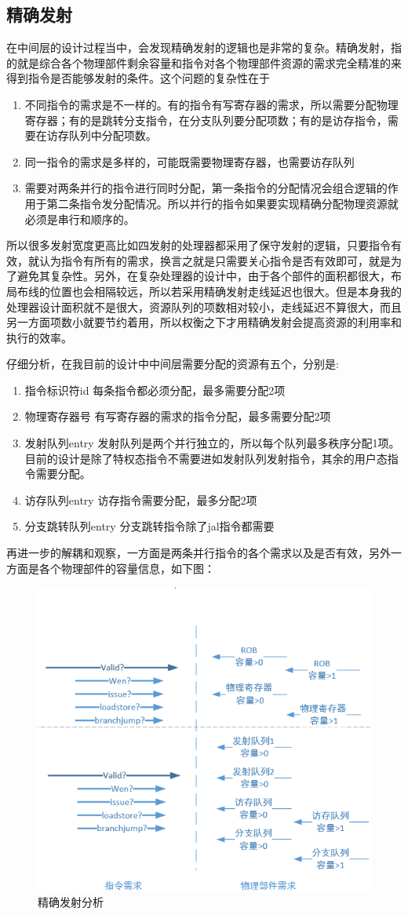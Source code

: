 \documentclass[11pt]{article}
\begin{document}
\subsection{精确发射}
在中间层的设计过程当中，会发现精确发射的逻辑也是非常的复杂。精确发射，指的就是综合各个物理部件剩余容量和指令对各个物理部件资源的需求完全精准的来得到指令是否能够发射的条件。这个问题的复杂性在于
\begin{enumerate}
	\item 不同指令的需求是不一样的。有的指令有写寄存器的需求，所以需要分配物理寄存器；有的是跳转分支指令，在分支队列要分配项数；有的是访存指令，需要在访存队列中分配项数。
	\item 同一指令的需求是多样的，可能既需要物理寄存器，也需要访存队列
	\item 需要对两条并行的指令进行同时分配，第一条指令的分配情况会组合逻辑的作用于第二条指令发分配情况。所以并行的指令如果要实现精确分配物理资源就必须是串行和顺序的。
\end{enumerate}
所以很多发射宽度更高比如四发射的处理器都采用了保守发射的逻辑，只要指令有效，就认为指令有所有的需求，换言之就是只需要关心指令是否有效即可，就是为了避免其复杂性。另外，在复杂处理器的设计中，由于各个部件的面积都很大，布局布线的位置也会相隔较远，所以若采用精确发射走线延迟也很大。但是本身我的处理器设计面积就不是很大，资源队列的项数相对较小，走线延迟不算很大，而且另一方面项数小就要节约着用，所以权衡之下才用精确发射会提高资源的利用率和执行的效率。

仔细分析，在我目前的设计中中间层需要分配的资源有五个，分别是:
\begin{enumerate}
	\item 指令标识符id       每条指令都必须分配，最多需要分配2项
	\item 物理寄存器号       有写寄存器的需求的指令分配，最多需要分配2项
	\item 发射队列entry     发射队列是两个并行独立的，所以每个队列最多秩序分配1项。目前的设计是除了特权态指令不需要进如发射队列发射指令，其余的用户态指令需要分配。
	\item 访存队列entry     访存指令需要分配，最多分配2项
	\item 分支跳转队列entry  分支跳转指令除了jal指令都需要
\end{enumerate}
再进一步的解耦和观察，一方面是两条并行指令的各个需求以及是否有效，另外一方面是各个物理部件的容量信息，如下图：
\begin{figure}[H]
	\centering
	\includegraphics[width=0.6\linewidth]{figs/issue.png}
	\caption{精确发射分析}
\end{figure}
\end{document}
